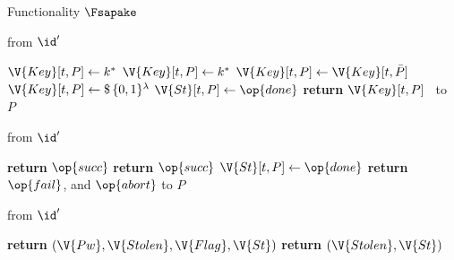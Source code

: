 \begin{interface}[nofloat]{Functionality $\Fsapake$ \\
}
{\begin{multicols}{2}
 \quad from $\id'$
\begin{algorithmic}[1]
\algcont
{}
  \State $\V{Key}[t,P] \gets k^{*}$
\EndIf
{}
  \State $\V{Key}[t,P] \gets k^{*}$ \label{ln:sapakeflagkey}
\EndIf
{}
  \State $\V{Key}[t,P] \gets \V{Key}[t,\bar{P}]$ \label{ln:sapakematch}
\EndIf
{}
  \State $\V{Key}[t,P] \gets \$\,\{0,1\}^{\lambda}$
\EndIf
\State $\V{St}[t,P] \gets \op{done}$
\State \textbf{return} $\V{Key}[t,P]$ \ to $P$
\algsave
\end{algorithmic}
\vspace{1.4ex}

 \quad from $\id'$
\begin{algorithmic}[1]
\algcont
{}
  \State \textbf{return} $\op{succ}$
\EndIf
{}
  \State \textbf{return} $\op{succ}$ \label{ln:sapakenoabort}
\EndIf
\State $\V{St}[t,P] \gets \op{done}$
\State \textbf{return} $\op{fail}$, and $\op{abort}$ to $P$
\algsave
\end{algorithmic}
\vspace{1.4ex}

 \quad from $\id'$
\begin{algorithmic}[1]
\algcont
{}
  \State \textbf{return} $(\V{Pw}, \V{Stolen}, \V{Flag}, \V{St})$ \label{ln:sapakeleaks}
\EndIf
\State \textbf{return} $(\V{Stolen}, \V{St})$ \label{ln:sapakeleak}
\algsave
\end{algorithmic}
\end{multicols}}
\end{interface}
